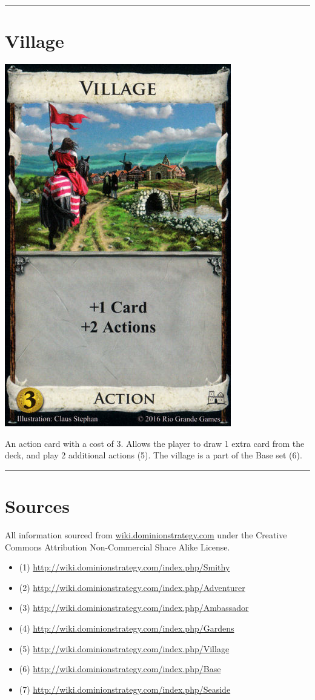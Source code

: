 \documentclass[11pt]{article}
\begin{document}
\noindent\rule{\textwidth}{0.5pt}

\section*{Village}
\label{sec:org4fcdc39}


\begin{center}
\includegraphics[width=0.25\linewidth]{./assets/village.jpg}
\end{center}

An action card with a cost of 3. Allows the player to draw 1 extra card from the deck, and play 2 additional actions (5). The village is a part of the Base set (6).


\noindent\rule{\textwidth}{0.5pt}

\section*{Sources}
\label{sec:orgc820c25}

All information sourced from \href{http://wiki.dominionstrategy.com/index.php/Main\_Page}{wiki.dominionstrategy.com} under the Creative Commons Attribution Non-Commercial Share Alike License.

\begin{itemize}
\item (1) \url{http://wiki.dominionstrategy.com/index.php/Smithy}
\item (2) \url{http://wiki.dominionstrategy.com/index.php/Adventurer}
\item (3) \url{http://wiki.dominionstrategy.com/index.php/Ambassador}
\item (4) \url{http://wiki.dominionstrategy.com/index.php/Gardens}
\item (5) \url{http://wiki.dominionstrategy.com/index.php/Village}
\item (6) \url{http://wiki.dominionstrategy.com/index.php/Base}
\item (7) \url{http://wiki.dominionstrategy.com/index.php/Seaside}
\end{itemize}
\end{document}
